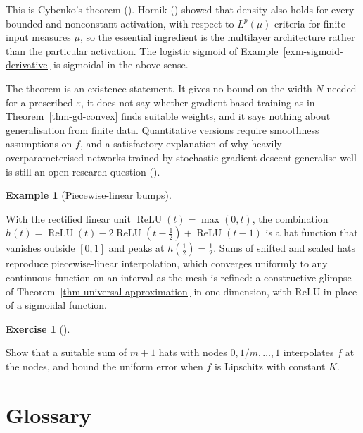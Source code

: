 \documentclass[
  english,
  11pt,
  a4paper,
  twoside,
  open=any,
  numbers=noenddot]{scrbook}
\theoremstyle{plain}
\theoremstyle{plain}
\theoremstyle{plain}
\theoremstyle{definition}
\theoremstyle{definition}
\newtheorem{exercise}{Exercise}[chapter]
\theoremstyle{definition}
\newtheorem{example}{Example}[chapter]
\theoremstyle{remark}
\begin{document}
This is Cybenko's theorem ().
Hornik () showed that density also holds
for every bounded and nonconstant activation, with respect to
\(L^p(\mu)\) criteria for finite input measures \(\mu\), so the
essential ingredient is the multilayer architecture rather than the
particular activation. The logistic sigmoid of
Example~\ref{exm-sigmoid-derivative} is sigmoidal in the above sense.

The theorem is an existence statement. It gives no bound on the width
\(N\) needed for a prescribed \(\varepsilon\), it does not say whether
gradient-based training as in Theorem~\ref{thm-gd-convex} finds suitable
weights, and it says nothing about generalisation from finite data.
Quantitative versions require smoothness assumptions on \(f\), and a
satisfactory explanation of why heavily overparameterised networks
trained by stochastic gradient descent generalise well is still an open
research question ().

\begin{example}[Piecewise-linear
bumps]\protect\hypertarget{exm-relu-hat}{}\label{exm-relu-hat}

With the rectified linear unit \(\operatorname{ReLU}(t) = \max(0,t)\),
the combination
\(h(t) = \operatorname{ReLU}(t) - 2\operatorname{ReLU}(t - \tfrac12) + \operatorname{ReLU}(t-1)\)
is a hat function that vanishes outside \([0,1]\) and peaks at
\(h(\tfrac12) = \tfrac12\). Sums of shifted and scaled hats reproduce
piecewise-linear interpolation, which converges uniformly to any
continuous function on an interval as the mesh is refined: a
constructive glimpse of Theorem~\ref{thm-universal-approximation} in one
dimension, with ReLU in place of a sigmoidal
function.

\end{example}

\begin{exercise}[]\protect\hypertarget{exr-hat}{}\label{exr-hat}

Show that a suitable sum of \(m+1\) hats with nodes \(0, 1/m, \dots, 1\)
interpolates \(f\) at the nodes, and bound the uniform error when \(f\)
is Lipschitz with constant \(K\).

\end{exercise}

\cleardoublepage
{}
{}
\appendix

\chapter{Glossary}\label{sec-glossary}
\end{document}
